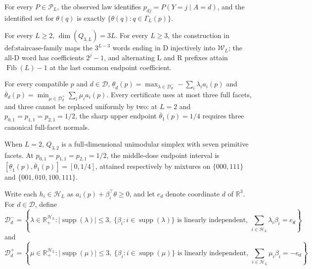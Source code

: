 For every \(P\in\mathcal P_L\), the observed law identifies \(p_{dj}=P(Y=j\mid A=d)\), and the identified set for \(\theta(q)\) is exactly \(\{\theta(q):q\in\Gamma_L(p)\}\).

For every \(L\ge2\), \(\dim(Q_{3,L})=3L\). For every \(L\ge3\), the construction in \(\text{def:staircase-family}\) maps the \(3^{L-3}\) words ending in \(\mathrm D\) injectively into \(\mathcal W_L\); the all-\(\mathrm D\) word has coefficients \(2^j-1\), and alternating \(\mathrm L\) and \(\mathrm R\) prefixes attain \(\operatorname{Fib}(L)-1\) at the last common endpoint coefficient.

For every compatible \(p\) and \(d\in\mathcal D\), \(\underline\theta_d(p)=\max_{\lambda\in\mathcal D_d^-}-\sum_i\lambda_i a_i(p)\) and \(\overline\theta_d(p)=\min_{\mu\in\mathcal D_d^+}\sum_i\mu_i a_i(p)\). Every certificate uses at most three full facets, and three cannot be replaced uniformly by two: at \(L=2\) and \(p_{0,1}=p_{1,1}=p_{2,1}=1/2\), the sharp upper endpoint \(\overline\theta_1(p)=1/4\) requires three canonical full-facet normals.

When \(L=2\), \(Q_{3,2}\) is a full-dimensional unimodular simplex with seven primitive facets. At \(p_{0,1}=p_{1,1}=p_{2,1}=1/2\), the middle-dose endpoint interval is \([\underline\theta_1(p),\overline\theta_1(p)]=[0,1/4]\), attained respectively by mixtures on \(\{000,111\}\) and \(\{001,010,100,111\}\).

Write each \(h_i\in\mathcal H_L\) as \(a_i(p)+\beta_i^\top\theta\ge0\), and let \(e_d\) denote coordinate \(d\) of \(\mathbb R^3\).  For \(d\in\mathcal D\), define
\[
 \mathcal D_d^-=
 \left\{\lambda\in\mathbb R_+^{\mathcal H_L}:
 |\operatorname{supp}(\lambda)|\le3,\ 
 \{\beta_i:i\in\operatorname{supp}(\lambda)\}\text{ is linearly independent},\ 
 \sum_{i\in\mathcal H_L}\lambda_i\beta_i=e_d\right\},
\]
and
\[
 \mathcal D_d^+=
 \left\{\mu\in\mathbb R_+^{\mathcal H_L}:
 |\operatorname{supp}(\mu)|\le3,\ 
 \{\beta_i:i\in\operatorname{supp}(\mu)\}\text{ is linearly independent},\ 
 \sum_{i\in\mathcal H_L}\mu_i\beta_i=-e_d\right\}.
\]
